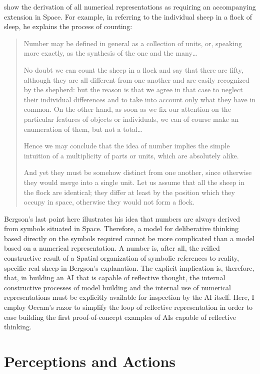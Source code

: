 \cite{bergson:1910} show the derivation of all numerical
representations as requiring an accompanying extension in Space.  For
example, in referring to the individual sheep in a flock of sleep, he
explains the process of counting:

\begin{quote}
Number may be defined in general as a collection of units, or,
speaking more exactly, as the synthesis of the one and the
many\ldots

No doubt we can count the sheep in a flock and say that there are
fifty, although they are all different from one another and are easily
recognized by the shepherd: but the reason is that we agree in that
case to neglect their individual differences and to take into account
only what they have in common.  On the other hand, as soon as we fix
our attention on the particular features of objects or individuals, we
can of course make an enumeration of them, but not a total\ldots

Hence we may conclude that the idea of number implies the simple
intuition of a multiplicity of parts or units, which are absolutely
alike.

And yet they must be somehow distinct from one another, since
otherwise they would merge into a single unit.  Let us assume that all
the sheep in the flock are identical; they differ at least by the
position which they occupy in space, otherwise they would not form a
flock.
\end{quote}

Bergson's last point here illustrates his idea that numbers are always
derived from symbols situated in Space.  Therefore, a model for
deliberative thinking based directly on the symbols required cannot be
more complicated than a model based on a numerical representation.  A
number is, after all, the reified constructive result of a Spatial
organization of symbolic references to reality, specific real sheep in
Bergson's explanation.  The explicit implication is, therefore, that,
in building an AI that is capable of reflective thought, the internal
constructive processes of model building and the internal use of
numerical representations must be explicitly available for inspection
by the AI itself.  Here, I employ Occam's razor to simplify the loop
of reflective representation in order to ease building the first
proof-of-concept examples of AIs capable of reflective thinking.

\section{Perceptions and Actions}

